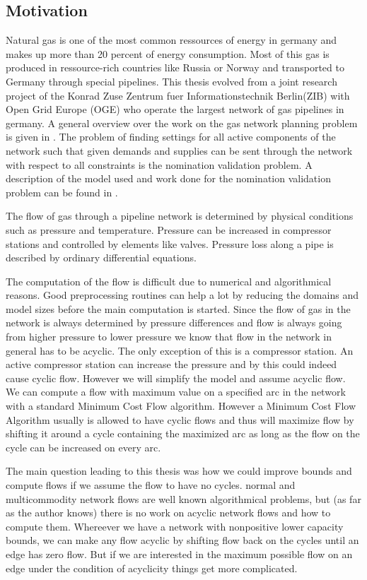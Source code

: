 \subsection{Motivation}
Natural gas is one of the most common ressources of energy in germany and makes up more than 20 percent of energy 
consumption. Most of this gas is produced in ressource-rich countries like Russia or Norway and transported to Germany 
through special pipelines. 
This thesis evolved from a joint research project of the Konrad Zuse Zentrum fuer Informationstechnik Berlin(ZIB) with 
Open Grid Europe (OGE) who operate the largest network of gas pipelines in germany. 
A general overview over the work on the gas network planning problem is given in 
\cite{FuegenschuhGeisslerGollmeretal.2013}. The problem of finding settings for all active components of the network 
such that given demands and supplies can be sent through the network with respect to all constraints is the nomination 
validation problem. A description of the model used and work done for the nomination validation problem can be 
found in \cite{PfetschFuegenschuhGeissleretal.2012}. 

The flow of gas through a pipeline network is determined by physical conditions such as pressure and temperature. 
Pressure can be increased in compressor stations and controlled by elements like valves. Pressure loss along a pipe is 
described by ordinary differential equations. 

The computation of the flow is difficult due to numerical and algorithmical reasons. Good preprocessing 
routines can help a lot by reducing the domains and model sizes before the main computation is started.
Since the flow of gas in the network is always determined by pressure differences and flow is always going from higher 
pressure to lower pressure we know that flow in the network in general has to be acyclic. The only exception of this 
is a compressor station. An active compressor station can increase the pressure and by this could indeed cause cyclic 
flow. However we will simplify the model and assume acyclic flow. 
We can compute a flow with 
maximum value on a specified arc in the network with a standard Minimum Cost Flow algorithm. 
However a Minimum Cost Flow Algorithm usually is allowed to have cyclic flows and thus will maximize flow by shifting 
it around a cycle containing the maximized arc as long as the flow on the cycle can be increased on every arc. 

The main question leading to this thesis was how we could improve bounds and compute flows if we assume the flow to 
have no cycles. normal and multicommodity network flows are well known algorithmical problems, but (as far as the 
author knows) there is no work on acyclic network flows and how to compute them. 
Whereever we have a network with nonpositive lower capacity bounds, we can make any flow acyclic by shifting flow 
back on the cycles until an edge has zero flow. But if we are interested in the maximum possible flow on an edge under 
the condition of acyclicity things get more complicated. 
